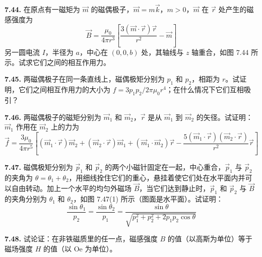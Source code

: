 \begin{center}
\end{center}

\vfill
\newpage

\textbf{7.44.} 在原点有一磁矩为 $\vec{m}$ 的磁偶极子，$\vec{m} = m\vec{k}$，$m > 0$，$\vec{m}$ 在 $\vec{r}$ 处产生的磁感强度为
\[
\vec{B} = \frac{\mu_0}{4\pi r^3} \left[ \frac{3(\vec{m}\cdot\vec{r})\vec{r}}{r^2} - \vec{m} \right]
\]
另一圆电流 $I$，半径为 $a$，中心在 $(0,0,b)$ 处，其轴线与 $z$ 轴重合，如图 7.44 所示。试求它们之间的相互作用力。

\begin{center}
\end{center}

\vfill
\newpage

\textbf{7.45.} 两磁偶极子在同一条直线上，磁偶极矩分别为 $p_1$ 和 $p_2$，相距为 $r$。试证明，它们之间相互作用力的大小为 $f = 3p_1 p_2 / 2\pi\mu_0 r^4$；在什么情况下它们互相吸引？

\vfill
\newpage

\textbf{7.46.} 两磁偶极子的磁矩分别为 $\vec{m}_1$ 和 $\vec{m}_2$，$\vec{r}$ 是从 $\vec{m}_1$ 到 $\vec{m}_2$ 的矢径。试证明：$\vec{m}_1$ 作用在 $\vec{m}_2$ 上的力为
\[
\vec{f} = \frac{3\mu_0}{4\pi r^5} \left[ (\vec{m}_1\cdot\vec{r})\vec{m}_2 + (\vec{m}_2\cdot\vec{r})\vec{m}_1 + (\vec{m}_1\cdot\vec{m}_2)\vec{r} - \frac{5(\vec{m}_1\cdot\vec{r})(\vec{m}_2\cdot\vec{r})}{r^2}\vec{r} \right]
\]

\vfill
\newpage

\textbf{7.47.} 磁偶极矩分别为 $\vec{p}_1$ 和 $\vec{p}_2$ 的两个小磁针固定在一起，中心重合，$\vec{p}_1$ 与 $\vec{p}_2$ 的夹角为 $\theta = \theta_1 + \theta_2$，用细线拴住它们的重心，悬挂着使它们处在水平面内并可以自由转动。加上一个水平的均匀外磁场 $\vec{B}$，当它们达到静止时，$\vec{p}_1$ 和 $\vec{p}_2$ 与 $\vec{B}$ 的夹角分别为 $\theta_1$ 和 $\theta_2$，如图 7.47(1) 所示（图面是水平面）。试证明：
\[
\frac{\sin\theta_1}{p_2} = \frac{\sin\theta_2}{p_1} = \frac{\sin\theta}{\sqrt{p_1^2 + p_2^2 + 2p_1 p_2 \cos\theta}}
\]

\begin{center}
\end{center}

\vfill
\newpage

\textbf{7.48.} 试论证：在非铁磁质里的任一点，磁感强度 $B$ 的值（以高斯为单位）等于磁场强度 $H$ 的值（以 $\mathrm{Oe}$ 为单位）。

\vfill
\newpage
